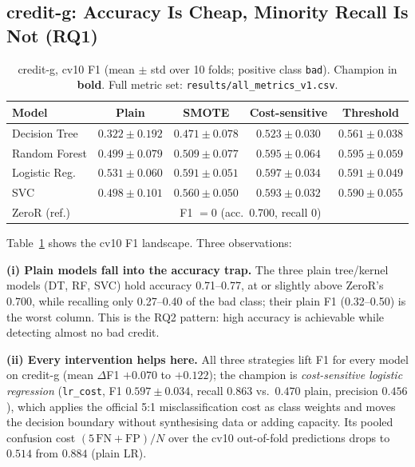 \subsection{credit-g: Accuracy Is Cheap, Minority Recall Is Not (RQ1)}
\label{sec:results-creditg}

\begin{table}[H]
\centering
\caption{credit-g, cv10 F1 (mean $\pm$ std over 10 folds; positive class \texttt{bad}). Champion in \textbf{bold}. Full metric set: \texttt{results/all\_metrics\_v1.csv}.}
\label{tab:creditg-f1}
\begin{tabular}{lcccc}
\toprule
Model & Plain & SMOTE & Cost-sensitive & Threshold \\
\midrule
Decision Tree & $0.322\pm0.192$ & $0.471\pm0.078$ & $0.523\pm0.030$ & $0.561\pm0.038$ \\
Random Forest & $0.499\pm0.079$ & $0.509\pm0.077$ & $0.595\pm0.064$ & $0.595\pm0.059$ \\
Logistic Reg. & $0.531\pm0.060$ & $0.591\pm0.051$ & $\mathbf{0.597\pm0.034}$ & $0.591\pm0.049$ \\
SVC & $0.498\pm0.101$ & $0.560\pm0.050$ & $0.593\pm0.032$ & $0.590\pm0.055$ \\
\midrule
ZeroR (ref.) & \multicolumn{4}{c}{F1 $=0$ (acc.\ 0.700, recall 0)} \\
\bottomrule
\end{tabular}
\end{table}

Table~\ref{tab:creditg-f1} shows the cv10 F1 landscape. Three observations:

\textbf{(i) Plain models fall into the accuracy trap.} The three plain tree/kernel models (DT, RF, SVC) hold accuracy 0.71--0.77, at or slightly above ZeroR's 0.700, while recalling only 0.27--0.40 of the bad class; their plain F1 (0.32--0.50) is the worst column. This is the RQ2 pattern: high accuracy is achievable while detecting almost no bad credit.

\textbf{(ii) Every intervention helps here.} All three strategies lift F1 for every model on credit-g (mean $\Delta$F1 $+0.070$ to $+0.122$); the champion is \emph{cost-sensitive logistic regression} (\texttt{lr\_cost}, F1 $0.597\pm0.034$, recall $0.863$ vs.\ $0.470$ plain, precision $0.456$), which applies the official 5:1 misclassification cost as class weights and moves the decision boundary without synthesising data or adding capacity. Its pooled confusion cost $(5\,\mathrm{FN}+\mathrm{FP})/N$ over the cv10 out-of-fold predictions drops to $0.514$ from $0.884$ (plain LR).

